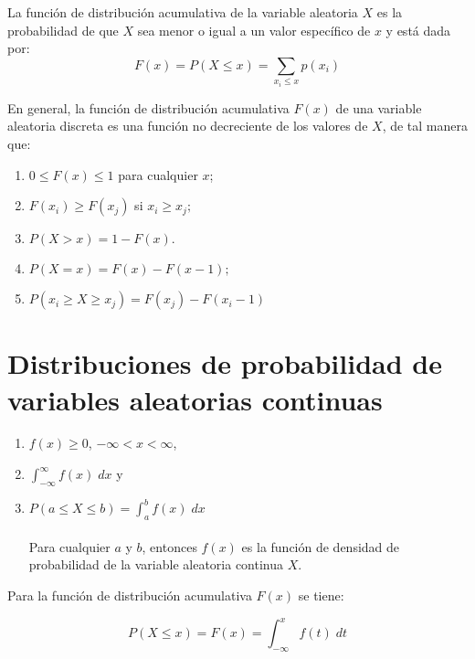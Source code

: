 \begin{tcolorbox}[colframe=white]
	\begin{def.}
	    La función de distribución acumulativa de la variable aleatoria $X$ es la probabilidad de que $X$ sea menor o igual a un valor específico de $x$ y está dada por:
	    $$F(x) = P(X\leq x) = \sum\limits_{x_i \leq x} p(x_i)$$
	\end{def.}
\end{tcolorbox}

En general, la función de distribución acumulativa $F(x)$ de una variable aleatoria discreta es una función no decreciente de los valores de $X$, de tal manera que:
\begin{enumerate}[\bfseries 1.]
    \item $0\leq F(x) \leq 1$ para cualquier $x$;
    \item $F(x_i)\geq F(x_j)$ si $x_i\geq x_j;$
    \item $P(X>x) = 1 - F(x).$
    \item $P(X=x) = F(x) - F(x-1);$
    \item $P(x_i \geq X \geq x_j) = F(x_j) - F(x_i - 1)$
\end{enumerate}

\section{Distribuciones de probabilidad de variables aleatorias continuas}

\begin{tcolorbox}[colframe=white]
    \begin{def.}
	\begin{enumerate}[\bfseries 1.]
	    \item $f(x)\geq 0$, $-\infty<x<\infty$,
	    \item $\displaystyle\int_{-\infty}^\infty f(x) \;dx$ y 
	    \item $P(a\leq X \leq b) = \displaystyle\int_{a}^{b} f(x) \; dx$\\\\
		Para cualquier $a$ y $b$, entonces $f(x)$ es la función de densidad de probabilidad de la variable aleatoria continua $X$.
	\end{enumerate}
    \end{def.}
\end{tcolorbox}

Para la función de distribución acumulativa $F(x)$ se tiene:
\begin{tcolorbox}[colframe=white]
    $$P(X\leq x) = F(x) = \int_{-\infty}^x f(t) \; dt$$
\end{tcolorbox}

